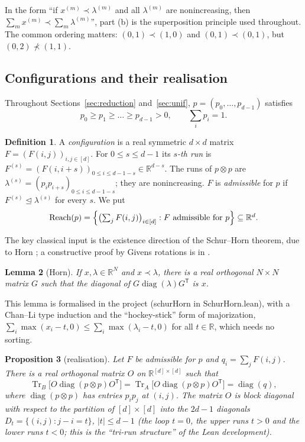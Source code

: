 \documentclass[11pt]{amsart}
\newtheorem{lemma}{Lemma}[section]
\newtheorem{proposition}[lemma]{Proposition}
\theoremstyle{definition}
\newtheorem{definition}[lemma]{Definition}
\theoremstyle{remark}
\numberwithin{equation}{section}
\newcommand{\R}{\mathbb{R}}
\newcommand{\Tr}{\operatorname{Tr}}
\newcommand{\diag}{\operatorname{diag}}
\newcommand{\Reach}{\operatorname{Reach}}
\newcommand{\dom}{\trianglelefteq}
\newcommand{\leanus}{\textunderscore\allowbreak}
\newcommand{\lean}[1]{{\ttfamily\let\_\leanus #1}}
\begin{document}
In the form ``if $x^{(m)}\prec\lambda^{(m)}$ and all $\lambda^{(m)}$ are nonincreasing, then
$\sum_m x^{(m)}\prec\sum_m\lambda^{(m)}$'', part (b) is the superposition principle used throughout.
The common ordering matters: $(0,1)\prec(1,0)$ and $(0,1)\prec(0,1)$, but $(0,2)\not\prec(1,1)$.

\subsection{Configurations and their realisation}
Throughout Sections~\ref{sec:reduction} and~\ref{sec:unif}, $p=(p_0,\dots,p_{d-1})$ satisfies
\[
  p_0\ge p_1\ge\dots\ge p_{d-1}>0,\qquad \sum_{i}p_i=1 .
\]

\begin{definition}\label{def:config}
A \emph{configuration} is a real symmetric $d\times d$ matrix $F=(F(i,j))_{i,j\in[d]}$. For
$0\le s\le d-1$ its \emph{$s$-th run} is $F^{(s)}=(F(i,i+s))_{0\le i\le d-1-s}\in\R^{d-s}$. The runs
of $p\otimes p$ are $\lambda^{(s)}=(p_ip_{i+s})_{0\le i\le d-1-s}$; they are nonincreasing. $F$ is
\emph{admissible} for $p$ if $F^{(s)}\dom\lambda^{(s)}$ for every $s$. We put
\[
  \Reach(p)=\Bigl\{\bigl(\textstyle\sum_{j}F(i,j)\bigr)_{i\in[d]} : F\text{ admissible for }p\Bigr\}\subseteq\R^d .
\]
\end{definition}

The key classical input is the existence direction of the Schur--Horn theorem, due to Horn
\cite{Schur1923,Horn1954}; a constructive proof by Givens rotations is in \cite{ChanLi1983}.

\begin{lemma}[Horn]\label{lem:horn}
If $x,\lambda\in\R^N$ and $x\prec\lambda$, there is a real orthogonal $N\times N$ matrix $G$ such
that the diagonal of $G\diag(\lambda)G^{\mathsf T}$ is $x$.
\end{lemma}

This lemma is formalised in the project (\lean{schurHorn} in \lean{SchurHorn.lean}), with a
Chan--Li type induction and the ``hockey-stick'' form of majorization,
$\sum_i\max(x_i-t,0)\le\sum_i\max(\lambda_i-t,0)$ for all $t\in\R$, which needs no sorting.

\begin{proposition}[realisation]\label{prop:realisation}
Let $F$ be admissible for $p$ and $q_i=\sum_jF(i,j)$. There is a real orthogonal matrix $O$ on
$\R^{[d]\times[d]}$ such that
\[
  \Tr_B\bigl[O\diag(p\otimes p)O^{\mathsf T}\bigr]=\Tr_A\bigl[O\diag(p\otimes p)O^{\mathsf T}\bigr]=\diag(q) ,
\]
where $\diag(p\otimes p)$ has entries $p_ip_j$ at $(i,j)$. The matrix $O$ is block diagonal with respect
to the partition of $[d]\times[d]$ into the $2d-1$ diagonals $D_t=\{(i,j):j-i=t\}$, $|t|\le d-1$ (the
loop $t=0$, the upper runs $t>0$ and the lower runs $t<0$; this is the ``tri-run structure'' of the
Lean development).
\end{proposition}
\end{document}
